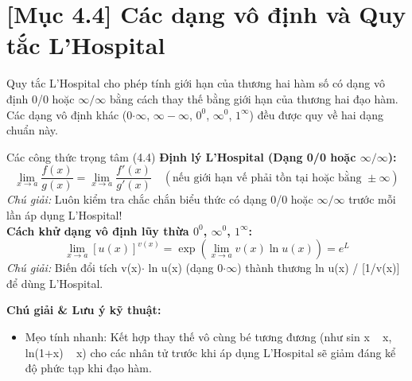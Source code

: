 \documentclass[11pt,a4paper,oneside]{book}
\begin{document}
\section{[Mục 4.4] Các dạng vô định và Quy tắc L'Hospital}
Quy tắc L'Hospital cho phép tính giới hạn của thương hai hàm số có dạng vô định 0/0 hoặc $\infty / \infty$ bằng cách thay thế bằng giới hạn của thương hai đạo hàm. Các dạng vô định khác (0$\cdot \infty$, $\infty - \infty$, $0^0$, $\infty^0$, $1^\infty$) đều được quy về hai dạng chuẩn này.

\begin{congthuc}{Các công thức trọng tâm (4.4)}
\noindent\textbf{Định lý L'Hospital (Dạng 0/0 hoặc $\infty / \infty$):}
\[ \lim_{x \to a} \frac{f(x)}{g(x)} = \lim_{x \to a} \frac{f'(x)}{g'(x)} \quad \left(\text{nếu giới hạn vế phải tồn tại hoặc bằng } \pm\infty\right) \]
\noindent\textit{Chú giải:} Luôn kiểm tra chắc chắn biểu thức có dạng 0/0 hoặc $\infty / \infty$ trước mỗi lần áp dụng L'Hospital!\\[4pt]
\noindent\textbf{Cách khử dạng vô định lũy thừa $0^0$, $\infty^0$, $1^\infty$:}
\[ \lim_{x \to a} [u(x)]^{v(x)} = \exp\left( \lim_{x \to a} v(x) \ln u(x) \right) = e^L \]
\noindent\textit{Chú giải:} Biến đổi tích v(x)$\cdot$ ln u(x) (dạng 0$\cdot \infty$) thành thương ln u(x) / [1/v(x)] để dùng L'Hospital.\\[4pt]
\end{congthuc}

\noindent\textbf{Chú giải \& Lưu ý kỹ thuật:}
\begin{itemize}[leftmargin=1.5em, itemsep=2pt]
  \item Mẹo tính nhanh: Kết hợp thay thế vô cùng bé tương đương (như sin x ~ x, ln(1+x) ~ x) cho các nhân tử trước khi áp dụng L'Hospital sẽ giảm đáng kể độ phức tạp khi đạo hàm.
\end{itemize}

\end{document}
